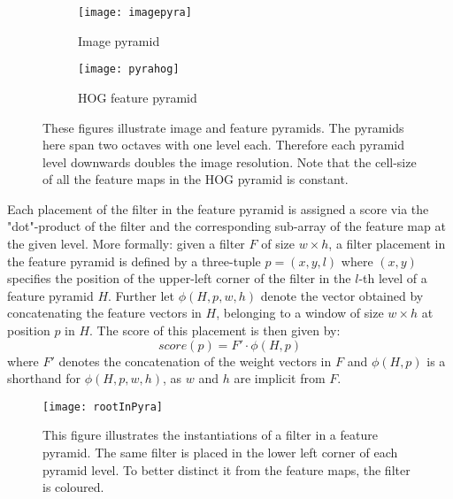 \begin{figure}[]
\begin{center}
        \begin{subfigure}[b]{0.49\textwidth}
                \texttt{[image: imagepyra]}
                \caption{Image pyramid}\label{fig:impyra}
        \end{subfigure}
        \begin{subfigure}[b]{0.49\textwidth}
               \texttt{[image: pyrahog]}
               \caption{HOG feature pyramid}\label{fig:featpyra}
        \end{subfigure}
\caption{These figures illustrate image and feature pyramids. The pyramids here span two octaves with one level each. Therefore each pyramid level downwards doubles the image resolution. Note that the cell-size of all the feature maps in the HOG pyramid is constant.}
\label{fig:pyra}
\end{center}
\end{figure}


Each placement of the filter in the feature pyramid is assigned a score via the "dot"-product of the filter and the corresponding sub-array of the feature map at the given level. More formally: given a filter $F$ of size $w\times h$, a filter placement in the feature pyramid is defined by a three-tuple $p=(x,y,l)$ where $(x,y)$ specifies the position of the upper-left corner of the filter in the $l$-th level of a feature pyramid $H$. Further let $\phi (H,p,w,h)$ denote the vector obtained by concatenating the feature vectors in $H$, belonging to a window of size $w\times h$ at position $p$ in $H$.  The score of this placement is then given by:
\begin{equation}
score(p)=F' \cdot \phi (H,p)
\end{equation}
where $F'$ denotes the concatenation of the weight vectors in $F$ and $\phi (H,p)$ is a shorthand for $\phi (H,p,w,h)$, as $w$ and $h$ are implicit from $F$. 

\begin{figure}[]
\begin{center}
\texttt{[image: rootInPyra]}           
\caption{This figure illustrates the instantiations of a filter in a feature pyramid. The same filter is placed in the lower left corner of each pyramid level. To better distinct it from the feature maps, the filter is coloured. }
\label{fig:rootInPyra}
\end{center}
\end{figure}
 
